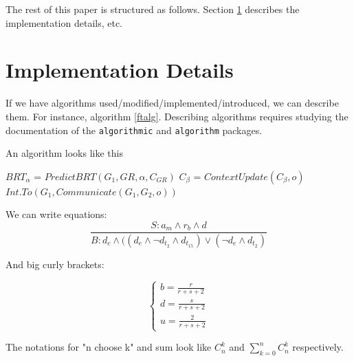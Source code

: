 \documentclass[11pt,a4paper,twoside,notitlepage]{article}
\newcommand{\mycomb}[2]{{C}_{#1}^{#2}}
\begin{document}
The rest of this paper is structured as follows. 
Section \ref{sec:s22} %
describes the implementation details, etc. 


\section{Implementation Details} 
\label{sec:s22} %

If we have algorithms used/modified/implemented/introduced, we can describe them. 
For instance, algorithm \ref{ftalg}. 
Describing algorithms requires studying the documentation of the \texttt{algorithmic} and \texttt{algorithm} packages.

\begin{algorithm}
 \caption{An algorithm looks like this} %
   \label{ftalg} %
   \begin{algorithmic}
      \STATE $BRT_{\alpha}$ = $PredictBRT(G_{1},GR,\alpha,C_{GR})$
      \STATE $C_{\beta}$ = $ContextUpdate(C_{\beta},o)$
     \ENDIF
        \STATE $Int.To(G_{1},Communicate(G_{1},G_{2},o))$
      \ENDIF
   \end{algorithmic}
\end{algorithm}

We can write equations:
\begin{equation} 
  \frac{S:a_{m} \land r_{b} \land d}
       {B:d_{c} \land ((d_{e} \land \neg d_{t_{2}} \land d_{t_{15}}) \lor (\neg d_{e} \land d_{t_{2}})}
\label{eq:e50}
\end{equation}

And big curly brackets:

\[\left \{ 
    \begin{array}{l}
        b=\frac{r}{r+s+2} \\
        d = \frac{s}{r+s+2}\\ 
        u = \frac{2}{r+s+2}
    \end{array}\right.
\]

The notations for "n choose k" and sum look like 
$\mycomb{n}{k}$ %
 and $\displaystyle \sum_{k=0}^{n} \mycomb{n}{k}$ respectively.
\end{document}
